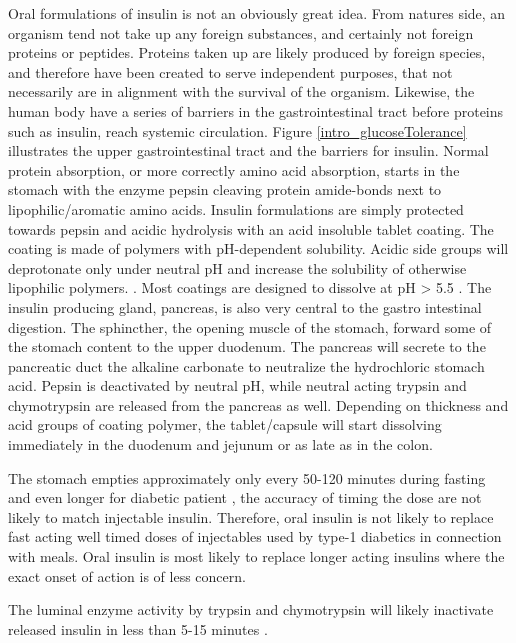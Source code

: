 Oral formulations of insulin is not an obviously great idea. From natures side, an organism tend not take up any foreign substances, and certainly not foreign proteins or peptides. Proteins taken up are likely produced by foreign species, and therefore have been created to serve independent purposes, that not necessarily are in alignment with the survival of the organism.
Likewise, the human body have a series of barriers in the gastrointestinal tract before proteins such as insulin, reach systemic circulation. Figure \cref{intro_glucoseTolerance} illustrates the upper gastrointestinal tract and the barriers for insulin. Normal protein absorption, or more correctly amino acid absorption, starts in the stomach with the enzyme pepsin cleaving protein amide-bonds next to lipophilic/aromatic amino acids. Insulin formulations are simply protected towards pepsin and acidic hydrolysis with an acid insoluble tablet coating. The coating is made of polymers with pH-dependent solubility. Acidic side groups will deprotonate only under neutral pH and increase the solubility of otherwise lipophilic polymers. \cite{carino1999oral,gabor2010improving}. Most coatings are designed to dissolve at pH > 5.5 \cite{maher2014formulation}.
The insulin producing gland, pancreas, is also very central to the gastro intestinal digestion. The sphincther, the opening muscle of the stomach, forward some of the stomach content to the upper duodenum. The pancreas will secrete to the pancreatic duct the alkaline carbonate to neutralize the hydrochloric stomach acid. Pepsin is deactivated by neutral pH, while neutral acting trypsin and chymotrypsin are released from the pancreas as well. Depending on thickness and acid groups of coating polymer, the tablet/capsule will start dissolving immediately in the duodenum and jejunum or as late as in the colon.

The stomach empties approximately only every 50-120 minutes during fasting and even longer for diabetic patient \cite{silverthorn2010human,corvilain1995effect,gabor2010improving}, the accuracy of timing the dose are not likely to match injectable insulin. Therefore, oral insulin is not likely to replace fast acting well timed doses of injectables used by type-1 diabetics in connection with meals. Oral insulin is most likely to replace longer acting insulins where the exact onset of action is of less concern.

The luminal enzyme activity by trypsin and chymotrypsin will likely inactivate released insulin in less than 5-15 minutes \cite{welling2014citric}.

